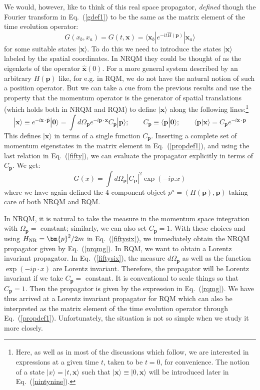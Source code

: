 \documentclass{article}
\def\eq#1{{Eq.~(\ref{#1})}}
\def\ket#1{|#1\rangle}                    %
\def\bk#1#2#3{{\langle #1|#2|#3\rangle}}  %
\def\amp#1#2{\langle #1 | #2\rangle}      %
\begin{document}
We would, however, like to think of this real space propagator, \textit{defined} though the Fourier transform in \eq{gdef1} to be the same as the matrix element of the time evolution operator:
\begin{equation}
 G(x_b,x_a)=G(t, \bm{x}) = \bk{\bm{x}_b}{e^{-it \hat{H}(\bm{p})}}{\bm{x}_a} 
 \label{propdef1}
\end{equation}
for some suitable states $\ket{\bm{x}}$. 
  To do this we need to introduce the states $\ket{\bm{x}}$ labeled by the spatial coordinates. In NRQM they could be thought of as the eigenkets of the operator $\hat{\bm{x}}(0)$. For a more general system described by an arbitrary $H(\bm{p})$ like, for e.g. in RQM, we do not have the natural notion of such a position operator. But we can take a cue from the previous results and use
 the property that the momentum operator is the generator of spatial translations (which holds both in NRQM and RQM) to define $\ket{\bm{x}}$ along the following lines:\footnote{Here, as well as in most of the discussions which follow, we are interested in expressions at a given time $t$, taken to be $t=0$, for convenience. The notion of a state $\ket{x}=\ket{t,\bm{x}}$ such that $\ket{\bm{x}}\equiv\ket{0,\bm{x}}$ will be introduced later in
 \eq{nintynine}.}
 \begin{equation}
 \ket{ \bm{x}} \equiv e^{-i\bm{x}\cdot \hat{\bm{p}}}|\bm{0}\rangle = \int d\Omega_{ \bm{p}} e^{-i\bm{p\cdot x}}C_{ \bm{p}} |\bm{p}\rangle ; \qquad C_{ \bm{p}} \equiv \amp{\bm{p}}{\bm{0}};\qquad \amp{\bm{p}}{\bm{x}} = C_{\bm{p}} e^{-i\bm{x\cdot p}}
 \label{fifty}
\end{equation} 
 This defines $\ket{\bm{x}}$ in terms of a single function $C_{\bm{p}}$. Inserting a complete set of momentum eigenstates in the matrix element in \eq{propdef1}, and using the last relation in \eq{fifty}, we can evaluate the propagator explicitly in terms of $C_{\bm{p}}$. We get:
 \begin{equation}
 G(x) = \int d\Omega_{\bm{p}} | C_{\bm{p}}|^2 \exp(- i p.x)
 \label{fiftysix}
\end{equation} 
where we have again defined the 4-component object
$
 p^a = (H(\bm{p}), \bm{p})
$ taking care of both NRQM and RQM. 

In NRQM, it is natural to take the measure in the momentum space integration with $\Omega_{\bm{p}} =$ constant; similarly, we can also set $C_{\bm{p}}=1$. With these choices and using $H_{\rm NR} = \bm{p}^2/2m$ in \eq{fiftysix}, we immediately obtain the NRQM propagator given by \eq{nrqmg}.
In RQM, we want to obtain a Lorentz invariant propagator. In \eq{fiftysix}, the measure $d\Omega_{\bm{p}}$ as well as the function $\exp(-ip\cdot x)$ are Lorentz invariant. Therefore, the propagator will be Lorentz invariant if we take $C_{\bm{p}}=$ constant. It is conventional to scale things so that  $C_{\bm{p}}=1$. Then the propagator is given by the  expression in \eq{rqmg}.
 We have thus arrived at a Lorentz invariant propagator for RQM which can also be interpreted as the matrix element of the time evolution operator through \eq{propdef1}. Unfortunately, the situation is not so simple when we study it more closely.
\end{document}
